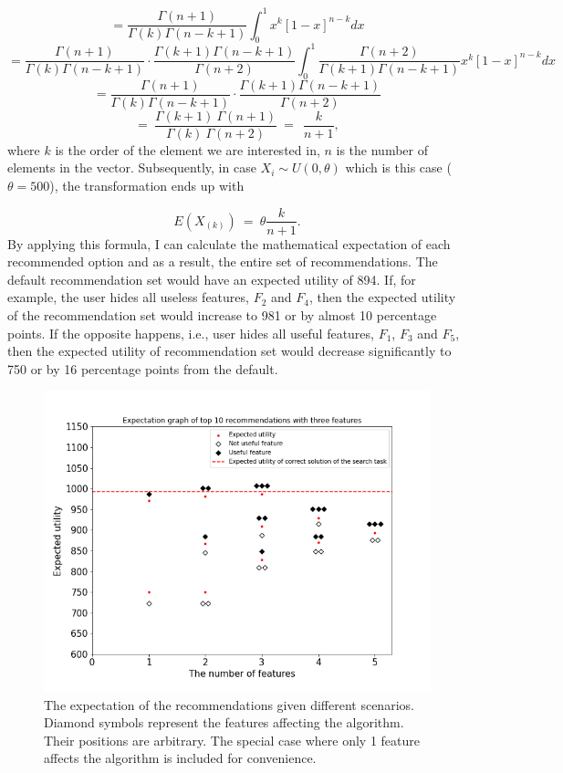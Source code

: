 \documentclass[a4paper,12pt]{article}
\begin{document}
$$
=\frac{\Gamma\left(n+1\right)}{\Gamma\left(k\right)\Gamma\left(n-k+1\right)}\int_{0}^{1}{x^k\left[1-x\right]^{n-k}}dx
$$
$$
=\frac{\Gamma\left(n+1\right)}{\Gamma\left(k\right)\Gamma\left(n-k+1\right)}\cdot\frac{\Gamma\left(k+1\right)\Gamma\left(n-k+1\right)}{\Gamma\left(n+2\right)}\int_{0}^{1}\frac{\Gamma\left(n+2\right)}{\Gamma\left(k+1\right)\Gamma\left(n-k+1\right)}x^k\left[1-x\right]^{n-k}dx
$$
$$
=\frac{\Gamma\left(n+1\right)}{\Gamma\left(k\right)\Gamma\left(n-k+1\right)}\cdot\frac{\Gamma\left(k+1\right)\Gamma\left(n-k+1\right)}{\Gamma\left(n+2\right)}
$$
$$
=\ \frac{\Gamma\left(k+1\right)\ \Gamma\left(n+1\right)}{\Gamma\left(k\right)\ \Gamma\left(n+2\right)}\ =\ \ \frac{k}{n+1} ,
$$
where $k$ is the order of the element we are interested in, $n$ is the number of elements in the vector. Subsequently, in case $X_i\sim U\left(0,\theta\right)$ which is this case ($\theta = 500$), the transformation ends up with 

$$
E\left(X_{\left(k\right)}\right)\ =\ \theta\frac{k}{n+1} .
$$
By applying this formula, I can calculate the mathematical expectation of each recommended option and as a result, the entire set of recommendations. The default recommendation set would have an expected utility of 894. If, for example, the user hides all useless features, $F_2$ and $F_4$, then the expected utility of the recommendation set would increase to 981 or by almost 10 percentage points. If the opposite happens, i.e., user hides all useful features, $F_1$, $F_3$ and $F_5$, then the expected utility of recommendation set would decrease significantly to 750 or by 16 percentage points from the default.

\begin{figure}
    \centering
    \includegraphics[width=0.8\linewidth]{staticFiles/ThreeFeaturesExpectationTop10SUMutility.png}
    \caption[The expectation of the recommendations]{The expectation of the recommendations given different scenarios. Diamond symbols represent the features affecting the algorithm. Their positions are arbitrary. The special case where only 1 feature affects the algorithm is included for convenience.}
    \label{fig:expectationGraph}
\end{figure}
\end{document}

